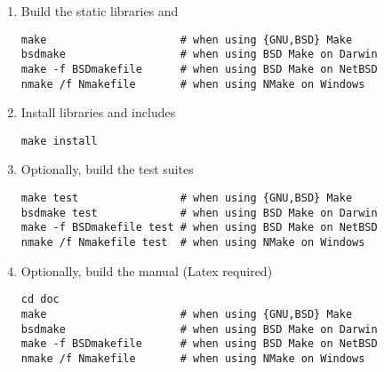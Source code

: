 \begin{enumerate}
\item Build the static libraries  and 
\begin{lstlisting}
make                     # when using {GNU,BSD} Make
bsdmake                  # when using BSD Make on Darwin
make -f BSDmakefile      # when using BSD Make on NetBSD
nmake /f Nmakefile       # when using NMake on Windows
\end{lstlisting}
\item Install libraries and includes
\begin{lstlisting}
make install 
\end{lstlisting}
\item Optionally, build the test suites 
\begin{lstlisting}
make test                # when using {GNU,BSD} Make
bsdmake test             # when using BSD Make on Darwin
make -f BSDmakefile test # when using BSD Make on NetBSD
nmake /f Nmakefile test  # when using NMake on Windows
\end{lstlisting}
\item Optionally, build the manual (Latex required)
\begin{lstlisting}
cd doc
make                     # when using {GNU,BSD} Make
bsdmake                  # when using BSD Make on Darwin
make -f BSDmakefile      # when using BSD Make on NetBSD
nmake /f Nmakefile       # when using NMake on Windows
\end{lstlisting}
\end{enumerate}
